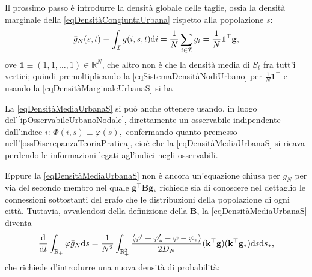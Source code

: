       Il prossimo passo è introdurre la densità globale delle taglie, ossia la densità marginale della \cref{eqDensitàCongiuntaUrbana} rispetto alla popolazione \(s\):
      \begin{equation}
        \label{eqDensitàMarginaleUrbanaS}
        \bar g_N(s,t)
        \equiv\int_{\mathcal I}g(i,s,t)\mathrm{d} i
        =\frac1N\sum_{i\in\mathcal I}g_i
        =\frac1N\mathbf 1^\top\mathbf g,
      \end{equation}
      ove \(\mathbf 1\equiv(1,1,\ldots,1)\in\mathbb R^N\), che altro non è che la densità media di \(S_t\) fra tutt'i vertici\footnotemark{}; quindi premoltiplicando la \cref{eqSistemaDensitàNodiUrbano} per \(\frac1N\mathbf 1^\top\) e usando la \cref{eqDensitàMarginaleUrbanaS} si ha%
 
      \begin{oss}
        La \ref{eqDensitàMediaUrbanaS} si può anche ottenere usando, in luogo del'\cref{ipOsservabileUrbanoNodale}, direttamente un osservabile indipendente dall'indice \(i\): \(\Phi(i,s)\equiv\varphi(s),\) confermando quanto premesso nell'\cref{ossDiscrepanzaTeoriaPratica}, cioè che la \ref{eqDensitàMediaUrbanaS} si ricava perdendo le informazioni legati agl'indici negli osservabili.
      \end{oss}

      Eppure la \ref{eqDensitàMediaUrbanaS} non è ancora un'equazione chiusa per \(\bar g_N\) per via del secondo membro nel quale \(\mathbf g^\top\mathbf B\mathbf g_*\) richiede sia di conoscere nel dettaglio le connessioni sottostanti del grafo che le distribuzioni della popolazione di ogni città. Tuttavia, avvalendosi della definizione della \(\mathbf B\), la \ref{eqDensitàMediaUrbanaS} diventa
      \begin{equation}
        \label{eqPrimaIntroduzioneDensitàGradi}
        \frac{\mathrm{d}}{\mathrm{d}t}\int_{\mathbb R_+}\varphi\bar g_N\mathrm{d} s=
        \frac1{N^2}\int_{\mathbb R_+^2}
        \frac{\langle\varphi'+\varphi'_*-\varphi-\varphi_*\rangle}{2D_N}
        (\mathbf k^\top\mathbf g)(\mathbf k^\top\mathbf g_*)\mathrm{d} s\mathrm{d} s_*,
      \end{equation}
      che richiede d'introdurre una nuova densità di probabilità:

